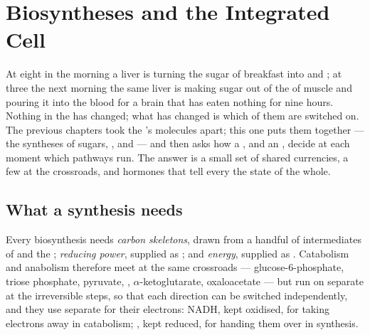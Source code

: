 \chapter{Biosyntheses and the Integrated Cell}\label{ch:b1:biosyntheses-integration}

At eight in the morning a liver is turning the sugar of breakfast into
 and ; at three the next morning the same liver is making
sugar out of the  of muscle and pouring it into the blood
for a brain that has eaten nothing for nine hours. Nothing in the
 has changed; what has changed is which of them are switched on.
The previous chapters took the 's molecules apart; this one puts
them together --- the syntheses of sugars, ,  and  --- and then asks how a , and an , decide at each
moment which pathways run. The answer is a small set of shared
currencies, a few  at the crossroads, and hormones that tell
every  the state of the whole.

\section{What a synthesis needs}

\begin{proposition}\label{prop:b1:biosyntheses-integration:needs}
Every biosynthesis needs \emph{carbon skeletons}, drawn from a handful
of intermediates of  and the ; \emph{reducing
power}, supplied as ; and \emph{energy}, supplied as .
Catabolism and anabolism therefore meet at the same crossroads ---
glucose-6-phosphate, triose phosphate, pyruvate, ,
$\alpha$-ketoglutarate, oxaloacetate --- but run on separate  at
the irreversible steps, so that each direction can be switched
independently, and they use separate  for their electrons:
NADH, kept oxidised, for taking electrons away in catabolism; ,
kept reduced, for handing them over in synthesis.
\end{proposition}

